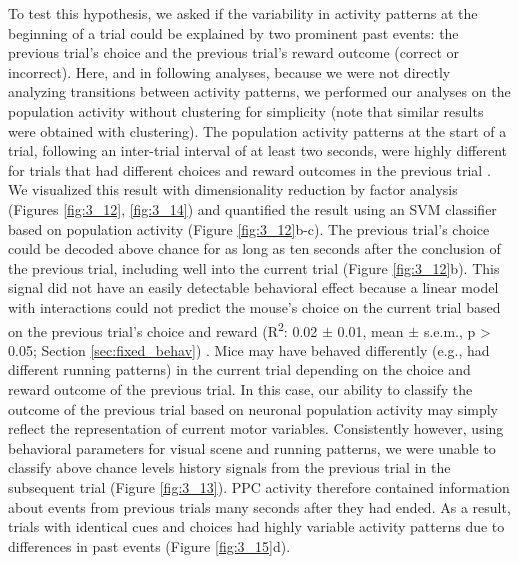 \bigskip
To test this hypothesis, we asked if the variability in activity patterns at the beginning of a trial could be explained by two prominent past events: the previous trial’s choice and the previous trial’s reward outcome (correct or incorrect). Here, and in following analyses, because we were not directly analyzing transitions between activity patterns, we performed our analyses on the population activity without clustering for simplicity (note that similar results were obtained with clustering). The population activity patterns at the start of a trial, following an inter-trial interval of at least two seconds, were highly different for trials that had different choices and reward outcomes in the previous trial \citep{Bernacchia:2011bb, Donahue:2015fi, Seo:2007jp, Seo:2007jv, Marcos:2013byba}. We visualized this result with dimensionality reduction by factor analysis (Figures \ref{fig:3_12}, \ref{fig:3_14}) and quantified the result using an SVM classifier based on population activity (Figure \ref{fig:3_12}b-c). The previous trial’s choice could be decoded above chance for as long as ten seconds after the conclusion of the previous trial, including well into the current trial (Figure \ref{fig:3_12}b). This signal did not have an easily detectable behavioral effect because a linear model with interactions could not predict the mouse’s choice on the current trial based on the previous trial’s choice and reward (R\textsuperscript{2}: 0.02 $\pm$ 0.01, mean $\pm$ s.e.m., p > 0.05; Section \ref{sec:fixed_behav}) \citep{Busse:2011ef}. Mice may have behaved differently (e.g., had different running patterns) in the current trial depending on the choice and reward outcome of the previous trial. In this case, our ability to classify the outcome of the previous trial based on neuronal population activity may simply reflect the representation of current motor variables. Consistently however, using behavioral parameters for visual scene and running patterns, we were unable to classify above chance levels history signals from the previous trial in the subsequent trial (Figure \ref{fig:3_13}). PPC activity therefore contained information about events from previous trials many seconds after they had ended. As a result, trials with identical cues and choices had highly variable activity patterns due to differences in past events (Figure \ref{fig:3_15}d). 

